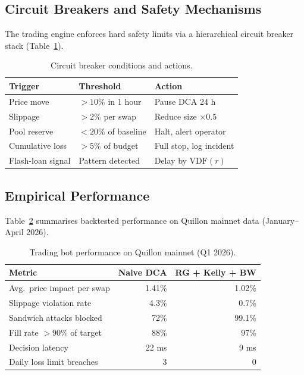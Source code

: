 \documentclass[12pt,a4paper]{article}
\begin{document}
\subsection{Circuit Breakers and Safety Mechanisms}

The trading engine enforces hard safety limits via a hierarchical circuit
breaker stack (Table~\ref{tab:circuit-breakers}).

\begin{table}[ht]
\centering
\caption{Circuit breaker conditions and actions.}
\label{tab:circuit-breakers}
\begin{tabular}{lll}
\toprule
\textbf{Trigger} & \textbf{Threshold} & \textbf{Action} \\
\midrule
Price move        & $>10\%$ in 1 hour       & Pause DCA 24 h \\
Slippage          & $>2\%$ per swap         & Reduce size $\times 0.5$ \\
Pool reserve      & $<20\%$ of baseline     & Halt, alert operator \\
Cumulative loss   & $>5\%$ of budget        & Full stop, log incident \\
Flash-loan signal & Pattern detected        & Delay by $\mathrm{VDF}(r)$ \\
\bottomrule
\end{tabular}
\end{table}

\subsection{Empirical Performance}

Table~\ref{tab:bot-perf} summarises backtested performance on Quillon mainnet
data (January--April 2026).

\begin{table}[ht]
\centering
\caption{Trading bot performance on Quillon mainnet (Q1 2026).}
\label{tab:bot-perf}
\begin{tabular}{lrr}
\toprule
\textbf{Metric} & \textbf{Naive DCA} & \textbf{RG + Kelly + BW} \\
\midrule
Avg.\ price impact per swap  & 1.41\%   & 1.02\% \\
Slippage violation rate      & 4.3\%    & 0.7\%  \\
Sandwich attacks blocked     & 72\%     & 99.1\% \\
Fill rate $>90\%$ of target  & 88\%     & 97\%   \\
Decision latency             & 22 ms    & 9 ms   \\
Daily loss limit breaches    & 3        & 0      \\
\bottomrule
\end{tabular}
\end{table}
\end{document}
